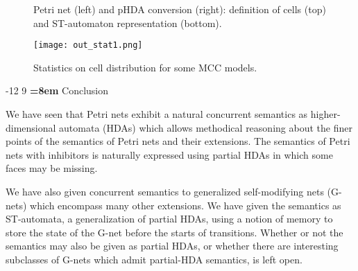 \documentclass[runningheads,envcountsame]{llncs}
\makeatletter
\renewcommand\section{\@startsection{section}{1}{\z@}%
  {-12\p@ \@plus -3\p@ \@minus -3\p@}%
  {9\p@ \@plus 3\p@ \@minus 3\p@}%
  {\normalfont\large\bfseries\boldmath
    \rightskip=\z@ \@plus 8em\pretolerance=10000 }}
\makeatother
\begin{document}
\begin{figure}[tbp]
  \centering
  \caption{Petri net (left) and pHDA conversion (right): definition of cells (top) and ST-automaton representation (bottom).}
  \label{fi:implem1}
\end{figure}

\begin{figure}[tbp]
  \begin{center}    
  \texttt{[image: out\_stat1.png]}
  \caption{Statistics on cell distribution for some MCC models.}
  \label{fi:implem2}
\end{center}
\end{figure}

\section{Conclusion}
\label{sec:conclusion}

We have seen that Petri nets exhibit a natural concurrent semantics as higher-dimensional automata (HDAs)
which allows methodical reasoning about the finer points of the semantics of Petri nets and their extensions.
The semantics of Petri nets with inhibitors is naturally expressed using partial HDAs
in which some faces may be missing.

We have also given concurrent semantics to generalized self-modifying nets (G-nets)
which encompass many other extensions.
We have given the semantics as ST-automata, a generalization of partial HDAs,
using a notion of memory to store the state of the G-net before the starts of transitions.
Whether or not the semantics may also be given as partial HDAs,
or whether there are interesting subclasses of G-nets which admit partial-HDA semantics, is left open.
\end{document}
